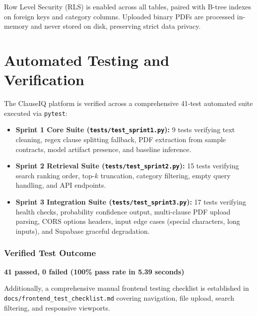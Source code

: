Row Level Security (RLS) is enabled across all tables, paired with B-tree indexes on foreign keys and category columns. Uploaded binary PDFs are processed in-memory and never stored on disk, preserving strict data privacy.

\section{Automated Testing and Verification}
\label{sec:automated_testing}

The ClauseIQ platform is verified across a comprehensive 41-test automated suite executed via \texttt{pytest}:
\begin{itemize}
    \item \textbf{Sprint 1 Core Suite (\texttt{tests/test\_sprint1.py}):} 9 tests verifying text cleaning, regex clause splitting fallback, PDF extraction from sample contracts, model artifact presence, and baseline inference.
    \item \textbf{Sprint 2 Retrieval Suite (\texttt{tests/test\_sprint2.py}):} 15 tests verifying search ranking order, top-$k$ truncation, category filtering, empty query handling, and API endpoints.
    \item \textbf{Sprint 3 Integration Suite (\texttt{tests/test\_sprint3.py}):} 17 tests verifying health checks, probability confidence output, multi-clause PDF upload parsing, CORS options headers, input edge cases (special characters, long inputs), and Supabase graceful degradation.
\end{itemize}

\subsubsection*{Verified Test Outcome}
\begin{center}
    \textbf{41 passed, 0 failed (100\% pass rate in 5.39 seconds)}
\end{center}

Additionally, a comprehensive manual frontend testing checklist is established in \texttt{docs/frontend\_test\_checklist.md} covering navigation, file upload, search filtering, and responsive viewports.

